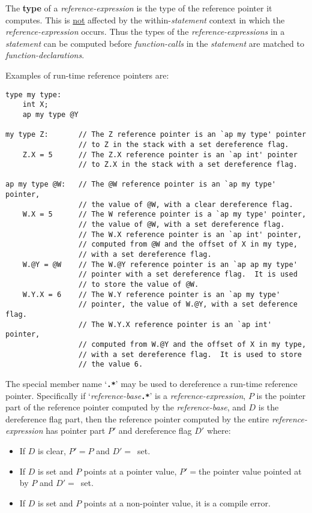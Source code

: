\documentclass[12pt]{article}
\newcommand{\TT}[1]{{\tt \bfseries #1}}
\newcommand{\key}[1]{{\rm \bfseries #1}}
\newenvironment{indpar}[1][0.3in]%
	{\begin{list}{}%
		     {\setlength{\itemsep}{0in}%
		      \setlength{\topsep}{0in}%
		      \setlength{\parsep}{1ex}%
		      \setlength{\labelwidth}{#1}%
		      \setlength{\leftmargin}{#1}%
		      \addtolength{\leftmargin}{\labelsep}}%
	 \item}%
	{\end{list}}
\begin{document}
The \key{type} of a {\em reference-expression} is the type of the reference
pointer it computes.  This is \underline{not} affected by the
within-{\em statement} context in which the {\em reference-expression}
occurs.  Thus the types of the {\em reference-expressions} in a
{\em statement} can be computed before {\em function-calls} in the
{\em statement} are matched to {\em function-declarations}.

Examples of run-time reference pointers are:
\begin{indpar}\small\begin{verbatim}
type my type:
    int X;
    ap my type @Y

my type Z:       // The Z reference pointer is an `ap my type' pointer
                 // to Z in the stack with a set dereference flag.
    Z.X = 5      // The Z.X reference pointer is an `ap int' pointer
                 // to Z.X in the stack with a set dereference flag.

ap my type @W:   // The @W reference pointer is an `ap my type' pointer,
                 // the value of @W, with a clear dereference flag.
    W.X = 5      // The W reference pointer is a `ap my type' pointer,
                 // the value of @W, with a set dereference flag.
                 // The W.X reference pointer is an `ap int' pointer,
                 // computed from @W and the offset of X in my type,
                 // with a set dereference flag.
    W.@Y = @W    // The W.@Y reference pointer is an `ap ap my type'
                 // pointer with a set dereference flag.  It is used
                 // to store the value of @W.
    W.Y.X = 6    // The W.Y reference pointer is an `ap my type'
                 // pointer, the value of W.@Y, with a set deference flag.
                 // The W.Y.X reference pointer is an `ap int' pointer,
                 // computed from W.@Y and the offset of X in my type,
                 // with a set dereference flag.  It is used to store
                 // the value 6.
\end{verbatim}\end{indpar}

The special member name `\TT{.*}' may be used to dereference
a run-time reference pointer.  Specifically if `{\em reference-base}\TT{.*}' is
a {\em reference-expression}, $P$ is the pointer part of the
reference pointer computed by the {\em reference-base}, and $D$
is the dereference flag part, then the reference pointer computed by
the entire {\em reference-expression} has pointer part $P'$ and dereference
flag $D'$ where:
\begin{itemize}
\item If $D$ is clear,
$P'=P$ and $D'=$~set.
\item If $D$ is set and $P$ points at a pointer value,
$P'=$the pointer value pointed at by $P$ and $D'=$~set.
\item If $D$ is set and $P$ points at a non-pointer value,
it is a compile error.
\end{itemize}
\end{document}

